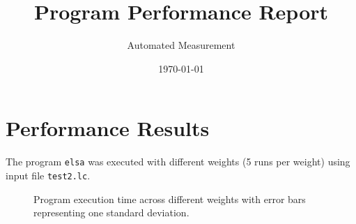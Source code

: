\documentclass{article}
\title{Program Performance Report}
\author{Automated Measurement}
\date{\today}
\begin{document}
\maketitle

\section{Performance Results}

The program \texttt{elsa} was executed with different weights (5 runs per weight) using input file \texttt{test2.lc}.

\begin{figure}[h]
\centering

\caption{Program execution time across different weights with error bars representing one standard deviation.}
\end{figure}
\end{document}
